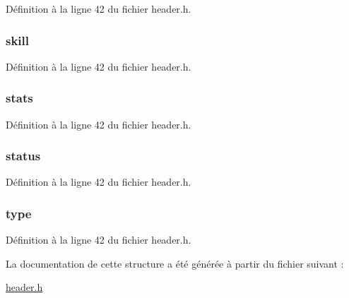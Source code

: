 Définition à la ligne 42 du fichier header.\-h.

\hypertarget{structt__character_ae7aa14804e69b1bc9652c16261da0c9f}{
\subsubsection[{skill}]{ skill}}\label{structt__character_ae7aa14804e69b1bc9652c16261da0c9f}


Définition à la ligne 42 du fichier header.\-h.

\hypertarget{structt__character_a29711825af64d428d19df366a5056670}{
\subsubsection[{stats}]{ stats}}\label{structt__character_a29711825af64d428d19df366a5056670}


Définition à la ligne 42 du fichier header.\-h.

\hypertarget{structt__character_a3ade6b90793e915ca28b52fb70e58e3f}{
\subsubsection[{status}]{ status}}\label{structt__character_a3ade6b90793e915ca28b52fb70e58e3f}


Définition à la ligne 42 du fichier header.\-h.

\hypertarget{structt__character_a3b5fecb9824668aab778f82005089942}{
\subsubsection[{type}]{ type}}\label{structt__character_a3b5fecb9824668aab778f82005089942}


Définition à la ligne 42 du fichier header.\-h.



La documentation de cette structure a été générée à partir du fichier suivant \-:\begin{DoxyCompactItemize}
\item 
\hyperlink{header_8h}{header.\-h}\end{DoxyCompactItemize}
